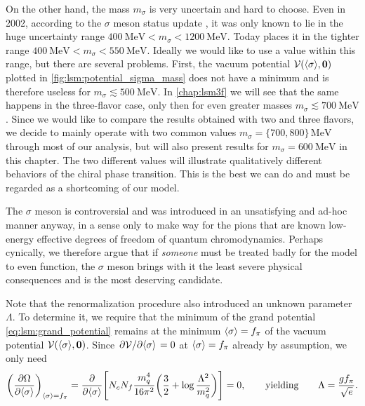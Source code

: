On the other hand, the mass $m_\sigma$ is very uncertain and hard to choose.
Even in 2002, according to the $\sigma$ meson status update \cite{ref:sigma_meson_status},
it was only known to lie in the huge uncertainty range $\SI{400}{\mega\electronvolt} < m_\sigma < \SI{1200}{\mega\electronvolt}$.
Today \cite{ref:pdg_review_2021} places it in the tighter range $\SI{400}{\mega\electronvolt} < m_\sigma < \SI{550}{\mega\electronvolt}$.
Ideally we would like to use a value within this range, but there are several problems.
First, the vacuum potential $\mathcal{V}(\langle \sigma \rangle,{\bm{0}})$ plotted in \cref{fig:lsm:potential_sigma_mass} does not have a minimum and is therefore useless for $m_\sigma \lesssim \SI{500}{\mega\electronvolt}$.
In \cref{chap:lsm3f} we will see that the same happens in the three-flavor case, only then for even greater masses $m_\sigma \lesssim \SI{700}{\mega\electronvolt}$.
Since we would like to compare the results obtained with two and three flavors,
we decide to mainly operate with two common values $m_\sigma = \{700,800\} \, \si{\mega\electronvolt}$ through most of our analysis,
but will also present results for $m_\sigma = \SI{600}{\mega\electronvolt}$ in this chapter.
The two different values will illustrate qualitatively different behaviors of the chiral phase transition.
This is the best we can do and must be regarded as a shortcoming of our model.

The $\sigma$ meson is controversial and was introduced in an unsatisfying and ad-hoc manner anyway,
in a sense only to make way for the pions that are known low-energy effective degrees of freedom of quantum chromodynamics.
Perhaps cynically, we therefore argue that if \emph{someone} must be treated badly for the model to even function,
the $\sigma$ meson brings with it the least severe physical consequences and is the most deserving candidate.

Note that the renormalization procedure also introduced an unknown parameter $\Lambda$.
To determine it, we require that the minimum of the grand potential \eqref{eq:lsm:grand_potential}
remains at the minimum $\langle \sigma \rangle = f_\pi$ of the vacuum potential $\mathcal{V}(\langle \sigma \rangle,{\bm{0}})$.
Since $\pdv{\mathcal{V}}/{\langle \sigma \rangle} = 0$ at $\langle \sigma \rangle=f_\pi$ already by assumption, we only need
\begin{equation}
	\pdv{\Omega}{ \langle \sigma \rangle}_{\langle \sigma \rangle=f_\pi} =
	\pdv*{\Bigg[ N_c N_f \frac{m_q^4}{16 \pi^2} \bigg( \frac32 + \log \frac{\Lambda^2}{m_q^2} \bigg) \Bigg] }{\langle \sigma \rangle} = 0,
	\qquad \text{yielding} \qquad
	\Lambda = \frac{g f_\pi}{\sqrt{e}}.
\label{eq:lsm:potential_vacuum_minimum}
\end{equation}

